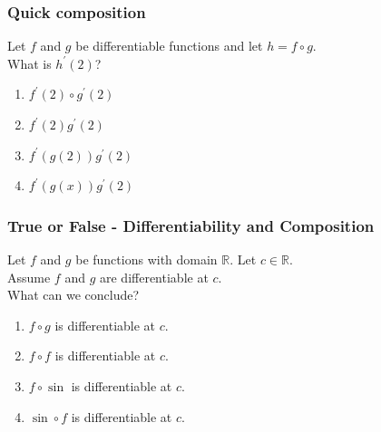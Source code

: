 \documentclass[14pt]{beamer}
\begin{document}
\begin{frame}
	\frametitle{Quick composition}

	Let $f$ and $g$ be differentiable functions and let $h=f\circ g$. \\ What is $h
	^{\prime}(2)$? \begin {enumerate} \item $f^{\prime}(2)\circ g^{\prime}(2)$
	\item $f^{\prime}(2)g^{\prime}(2)$ \item $f^{\prime}(g(2)) g^{\prime}(2)$
	\item $f^{\prime}(g(x)) g^{\prime}(2)$ \end{enumerate}

\end{frame}

\begin{frame}[t]
	\frametitle{True or False - Differentiability and Composition}

	Let $f$ and $g$ be functions with domain $\mathbb{R}$. Let $c \in \mathbb{R}$.
	\\ Assume $f$ and $g$ are differentiable at $c$. \\ What can we conclude?

	\vfill

	\begin{enumerate}
		\item $f \circ g$ \; is {\color{blue} differentiable} at $c$.
			\vfill

		\item $f \circ f$ \; is {\color{blue} differentiable} at $c$.
			\vfill

		\item $f \circ \sin$ \; is {\color{blue} differentiable} at $c$.
			\vfill

		\item $\sin \circ f$ \; is {\color{blue} differentiable} at $c$.
			\vfill
	\end{enumerate}
\end{frame}
\end{document}
